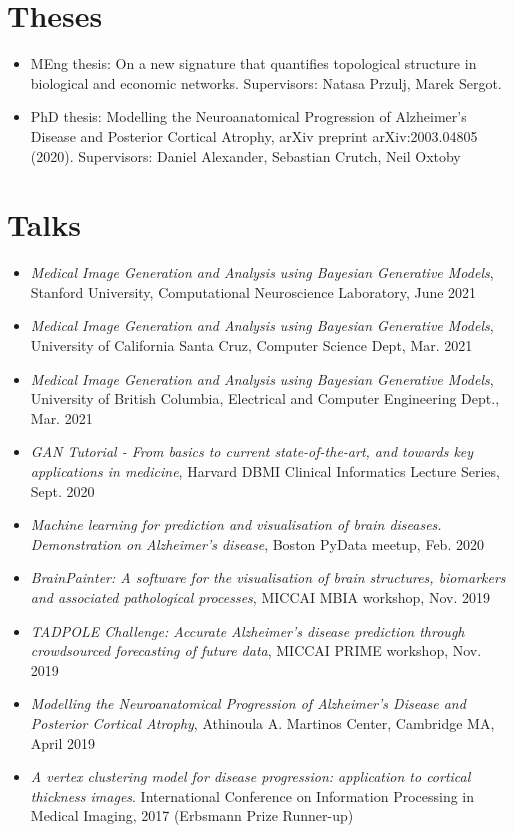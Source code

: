 \documentclass[a4paper,10pt]{article} %
\begin{document}
\section*{Theses}
\begin{itemize}
 \item MEng thesis: On a new signature that quantifies topological structure in biological and economic networks. Supervisors: Natasa Przulj, Marek Sergot.
 \item PhD thesis: Modelling the Neuroanatomical Progression of Alzheimer's Disease and Posterior Cortical Atrophy, arXiv preprint arXiv:2003.04805 (2020). Supervisors: Daniel Alexander, Sebastian Crutch, Neil Oxtoby
\end{itemize}

\section*{Talks}
\begin{itemize}
 \item \emph{Medical Image Generation and Analysis using Bayesian Generative Models}, Stanford University, Computational Neuroscience Laboratory, June 2021
 \item \emph{Medical Image Generation and Analysis using Bayesian Generative Models}, University of California Santa Cruz, Computer Science Dept, Mar. 2021
 \item \emph{Medical Image Generation and Analysis using Bayesian Generative Models}, University of British Columbia, Electrical and Computer Engineering Dept., Mar. 2021
 \item \emph{GAN Tutorial - From basics to current state-of-the-art, and towards key applications in medicine}, Harvard DBMI Clinical Informatics Lecture Series, Sept. 2020
 \item \emph{Machine learning for prediction and visualisation of brain diseases. Demonstration on Alzheimer's disease}, Boston PyData meetup, Feb. 2020
 \item \emph{BrainPainter: A software for the visualisation of brain structures, biomarkers and associated pathological processes}, MICCAI MBIA workshop, Nov. 2019
 \item \emph{TADPOLE Challenge: Accurate Alzheimer's disease prediction through crowdsourced forecasting of future data}, MICCAI PRIME workshop, Nov. 2019
 \item \emph{Modelling the Neuroanatomical Progression of Alzheimer's Disease and Posterior Cortical Atrophy}, Athinoula A. Martinos Center, Cambridge MA, April 2019
 \item \emph{A vertex clustering model for disease progression: application to cortical thickness images}. International Conference on Information Processing in Medical Imaging, 2017 (Erbsmann Prize Runner-up)
\end{itemize}
\end{document}
